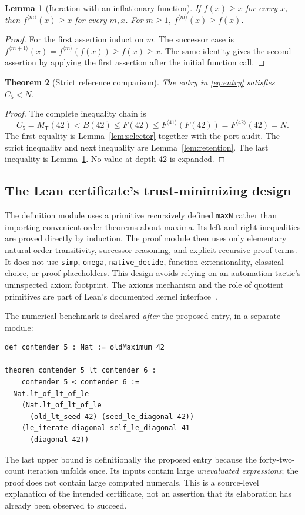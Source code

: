 \documentclass[11pt]{article}
\newtheorem{theorem}{Theorem}[section]
\newtheorem{lemma}[theorem]{Lemma}
\theoremstyle{definition}
\newcommand{\T}{\mathsf T}
\newcommand{\MT}{M_{\T}}
\newcommand{\Cfive}{C_5}
\newcommand{\itf}[3]{#1^{\langle #2\rangle}(#3)}
\begin{document}
\begin{lemma}[Iteration with an inflationary function]\label{lem:iteration}
If $f(x)\ge x$ for every $x$, then $\itf fmx\ge x$ for every $m,x$.
For $m\ge1$, $\itf fmx\ge f(x)$.
\end{lemma}
\begin{proof}
For the first assertion induct on $m$. The successor case is
$\itf f{m+1}x=\itf fm{f(x)}\ge f(x)\ge x$. The same identity gives the second
assertion by applying the first assertion after the initial function call.
\end{proof}

\begin{theorem}[Strict reference comparison]\label{thm:comparison}
The entry in \eqref{eq:entry} satisfies $\Cfive<N$.
\end{theorem}
\begin{proof}
The complete inequality chain is
\[
 \Cfive=\MT(42)<B(42)\le F(42)
 \le\itf F{41}{F(42)}=\itf F{42}{42}=N.
\]
The first equality is Lemma~\ref{lem:selector} together with the port audit.
The strict inequality and next inequality are Lemma~\ref{lem:retention}. The last
inequality is Lemma~\ref{lem:iteration}. No value at depth 42 is expanded.
\end{proof}

\subsection{The Lean certificate's trust-minimizing design}
The definition module uses a primitive recursively defined \texttt{maxN} rather
than importing convenient order theorems about maxima. Its left and right
inequalities are proved directly by induction. The proof module then uses
only elementary natural-order transitivity, successor reasoning, and explicit
recursive proof terms. It does not use \texttt{simp}, \texttt{omega},
\texttt{native\_decide}, function extensionality, classical choice, or proof
placeholders. This design avoids relying on an automation tactic's uninspected
axiom footprint. The axioms mechanism and the role of quotient primitives are
part of Lean's documented kernel interface~\cite{leanaxioms}.

The numerical benchmark is declared \emph{after} the proposed entry, in a
separate module:
\begin{lstlisting}
def contender_5 : Nat := oldMaximum 42

theorem contender_5_lt_contender_6 :
    contender_5 < contender_6 :=
  Nat.lt_of_lt_of_le
    (Nat.lt_of_lt_of_le
      (old_lt_seed 42) (seed_le_diagonal 42))
    (le_iterate diagonal self_le_diagonal 41
      (diagonal 42))
\end{lstlisting}
The last upper bound is definitionally the proposed entry because the
forty-two-count iteration unfolds once. Its inputs contain large \emph{unevaluated
expressions}; the proof does not contain large computed numerals. This is a
source-level explanation of the intended certificate, not an assertion that
its elaboration has already been observed to succeed.
\end{document}
